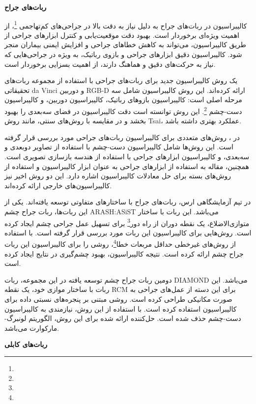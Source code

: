  
 \textbf {ربات‌های جراح}
 
 کالیبراسیون در ربات‌های جراح به دلیل نیاز به دقت بالا در جراحی‌های کم‌تهاجمی
 \footnote{}،
 از اهمیت ویژه‌ای برخوردار است. بهبود دقت موقعیت‌یابی و کنترل ابزارهای جراحی از طریق کالیبراسیون، می‌تواند به کاهش خطاهای جراحی و افزایش ایمنی بیماران منجر شود. کالیبراسیون دقیق ابزارهای جراحی و بازوی رباتیک، به ویژه در جراحی‌هایی که نیاز به حرکت‌های دقیق و هماهنگ دارند، از اهمیت بسزایی برخوردار است.
 
\cite{roberti2020improving}
یک روش کالیبراسیون جدید برای ربات‌های جراحی با استفاده از مجموعه‌ ربات‌های تحقیقاتی da Vinci و دوربین RGB-D ارائه کرده‌اند. این روش کالیبراسیون شامل سه مرحله اصلی است: کالیبراسیون بازوهای رباتیک، کالیبراسیون دوربین، و کالیبراسیون دست-چشم
\footnote{}.
 این روش توانسته است دقت کالیبراسیون در فضای سه‌بعدی را بهبود بخشد و در مقایسه با روش‌های سنتی، مانند روش Tsai، عملکرد بهتری داشته باشد.
 
 در 
 \cite{wang2017vision}،
روش‌های متعددی برای کالیبراسیون ربات‌های جراحی مورد بررسی قرار گرفته است. این روش‌ها شامل کالیبراسیون دست-چشم با استفاده از تصاویر دوبعدی و سه‌بعدی، و کالیبراسیون ابزارهای جراحی با استفاده از هندسه بازسازی تصویری است. همچنین، مقاله به استفاده از ابزارهای جراحی به عنوان ابزار کالیبراسیون و استفاده از روش‌های بسته برای حل معادلات کالیبراسیون اشاره دارد. این دو روش اخیر نیز کالیبراسیون‌های خارجی ارائه کرده‌اند. 

در تیم آزمایشگاهی ارس، ربات‌های جراح با ساختارهای متفاوتی توسعه یافته‌اند. یکی از این ربات‌ها، ربات جراح چشم ARASH:ASiST می‌باشد. این ربات با ساختار متوازی‌الاضلاع، یک نقطه دوران از راه دور\footnote{} برای تسهیل عمل جراحی چشم ایجاد کرده است. روش‌هایی برای کالیبراسیون این ربات مورد بررسی قرار گرفته است. \cite{hassani2021kinematic} با استفاده از روش‌های غیرخطی حداقل مربعات خطا\footnote{}، روشی را برای کالیبراسیون این ربات جراح چشم ارائه کرده است. نتیجه کالیبراسیون، بهبود چشم‌گیری در نتایج ایجاد کرده است.

دومین ربات جراح چشم توسعه یافته در این مجموعه، ربات DIAMOND می‌باشد. این ربات با ساختار موازی خود، یک نقطه RCM برای این دسته از عمل‌های جراحی به صورت مکانیکی طراحی کرده است. \cite{dindarloo2023kinematic} روشی مبتنی بر پنجره‌های نسبتی داده برای کالیبراسیون استفاده کرده است. با استفاده از این روش، نیازمندی به کالیبراسیون دست-چشم حذف شده است. حل‌کننده ارائه شده برای این روش، الگوریتم لونبرگ-مارکوارت می‌باشد.

\textbf {ربات‌های کابلی}

